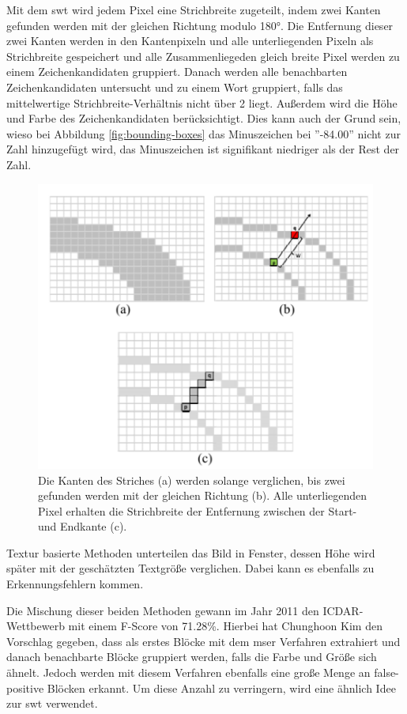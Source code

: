 Mit dem \Gls{swt} wird jedem Pixel eine Strichbreite zugeteilt, indem zwei Kanten gefunden werden mit der gleichen Richtung modulo 180°. Die Entfernung dieser zwei Kanten werden in den Kantenpixeln und alle unterliegenden Pixeln als Strichbreite gespeichert und alle Zusammenliegeden gleich breite Pixel werden zu einem Zeichenkandidaten gruppiert. Danach werden alle benachbarten Zeichenkandidaten untersucht und zu einem Wort gruppiert, falls das mittelwertige Strichbreite-Verhältnis nicht über 2 liegt. Außerdem wird die Höhe und Farbe des Zeichenkandidaten berücksichtigt. Dies kann auch der Grund sein, wieso bei Abbildung \ref{fig:bounding-boxes} das Minuszeichen bei ''-84.00'' nicht zur Zahl hinzugefügt wird, das Minuszeichen ist signifikant niedriger als der Rest der Zahl. \cite{SWT:online}

\begin{figure}[H]
    \centering
    \includegraphics[scale=0.7]{sections/machine-learning/images/SWT.png}
    \caption{Die Kanten des Striches (a) werden solange verglichen, bis zwei gefunden werden mit der gleichen Richtung (b). Alle unterliegenden Pixel erhalten die Strichbreite der Entfernung zwischen der Start- und Endkante (c).}
\end{figure}

Textur basierte Methoden unterteilen das Bild in Fenster, dessen Höhe wird später mit der geschätzten Textgröße verglichen. Dabei kann es ebenfalls zu Erkennungsfehlern kommen. \cite{OCR3:online}

Die Mischung dieser beiden Methoden gewann im Jahr 2011 den ICDAR-Wettbewerb mit einem F-Score von 71.28\%. Hierbei hat Chunghoon Kim den Vorschlag gegeben, dass als erstes Blöcke mit dem \Gls{mser} Verfahren extrahiert und danach benachbarte Blöcke gruppiert werden, falls die Farbe und Größe sich ähnelt. Jedoch werden mit diesem Verfahren ebenfalls eine große Menge an false-positive Blöcken erkannt. Um diese Anzahl zu verringern, wird eine ähnlich Idee zur \gls{swt} verwendet. \cite{SWT:online}

